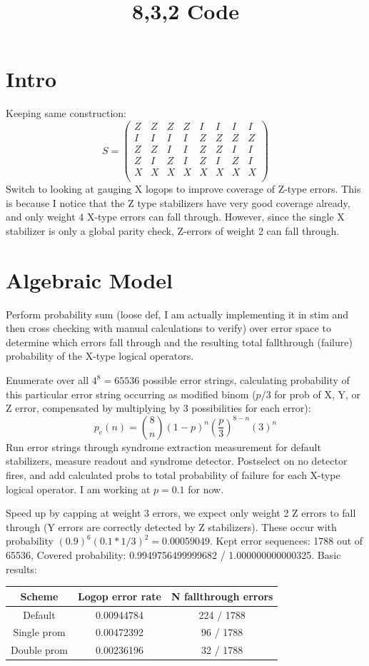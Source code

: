 \documentclass{article}
\title{8,3,2 Code}
\begin{document}
\section{Intro}
Keeping same construction: 
\[S = \begin{pmatrix}
    Z & Z & Z & Z & I & I & I & I\\
    I & I & I & I & Z & Z & Z & Z\\
    Z & Z & I & I & Z & Z & I & I\\
    Z & I & Z & I & Z & I & Z & I\\
    X & X & X & X & X & X & X & X\\
\end{pmatrix}\]
Switch to looking at gauging X logops to improve coverage of Z-type errors. This is because I notice that the Z type stabilizers have very good coverage already, and only weight 4 X-type errors can fall through. However, since the single X stabilizer is only a global parity check, Z-errors of weight 2 can fall through.

\section{Algebraic Model}
Perform probability sum (loose def, I am actually implementing it in stim and then cross checking with manual calculations to verify) over error space to determine which errors fall through and the resulting total fallthrough (failure) probability of the X-type logical operators. 

Enumerate over all $4^8 = 65536$ possible error strings, calculating probability of this particular error string occurring as modified binom ($p/3$ for prob of X, Y, or Z error, compensated by multiplying by 3 possibilities for each error):
\[p_e(n) = {8\choose n} (1-p)^n \left(\frac{p}{3}\right)^{8-n} (3)^n\]
Run error strings through syndrome extraction measurement for default stabilizers, measure readout and syndrome detector. Postselect on no detector fires, and add calculated probs to total probability of failure for each X-type logical operator. I am working at $p=0.1$ for now.

Speed up by capping at weight 3 errors, we expect only weight 2 Z errors to fall through (Y errors are correctly detected by Z stabilizers). These occur with probability $(0.9)^6(0.1*1/3)^2 = 0.00059049$. Kept error sequences: 1788 out of 65536, Covered probability: 0.9949756499999682 / 1.000000000000325. Basic results:
\begin{table}[h]
    \centering
    \begin{tabular}{c|c|c}
        Scheme & Logop error rate & N fallthrough errors \\
        \hline
        Default & 0.00944784 & 224 / 1788 \\
        \hline
        Single prom & 0.00472392 & 96 / 1788 \\
        \hline
        Double prom & 0.00236196 & 32 / 1788 \\
        \hline
    \end{tabular}
\end{table}
\end{document}
